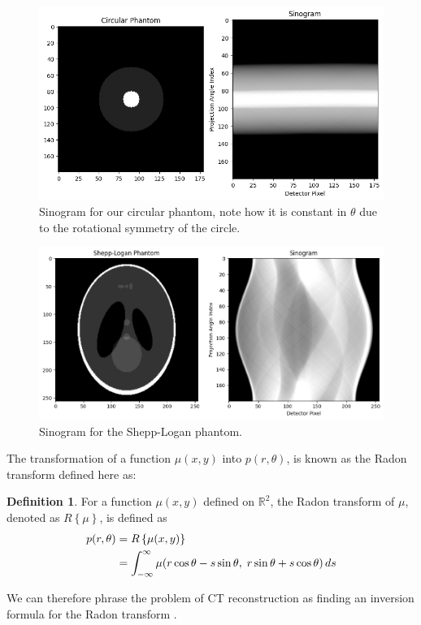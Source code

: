 \documentclass{article}
\theoremstyle{definition}
\newtheorem{definition}{Definition}[section]
\begin{document}
\begin{figure}[H]
	\includegraphics[scale=0.5]{sinogramcircle.png}
	\caption{Sinogram for our circular phantom, note how it is constant in $\theta$ due to the rotational symmetry of the circle.}
	\label{fig:sinogramcircle}
\end{figure}

\begin{figure}[H]
	\includegraphics[scale=0.5]{sinogramshepp.png}
	\caption{Sinogram for the Shepp-Logan phantom.}
	\label{fig:sinogramshepp}
\end{figure}

The transformation of a function $\mu (x,y)$ into $p(r, \theta)$, is known as the Radon transform defined here as:
\begin{definition}
For a function $\mu(x,y)$ defined on $\mathbb{R}^2$, the Radon transform of $\mu$, denoted as $R\left\{\mu \right\}$, is defined as
\begin{align*}
p(r, \theta) &= R \left\{ \mu(x,y) \right\} \notag \\
             &= \int_{-\infty}^{\infty} \mu(r \cos\theta - s \sin\theta,\; r \sin\theta + s \cos\theta) \, ds
\end{align*}
\end{definition}
We can therefore phrase the problem of CT reconstruction as finding an inversion formula for the Radon transform \cite{Beatty2012}. 
\end{document}
